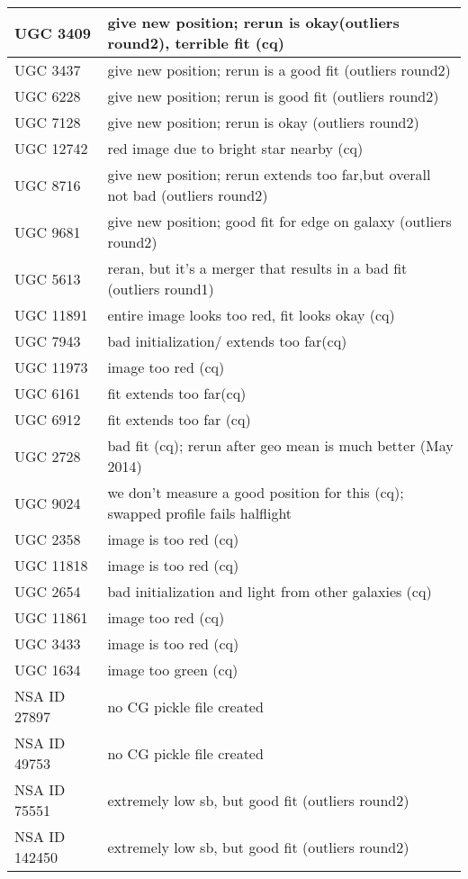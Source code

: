 \documentclass[10pt]{article}
\begin{document}
\begin{landscape}
\begin{longtable}{|l|l|}
UGC 3409 & give new position; rerun is okay(outliers round2), terrible fit (cq)\\ \hline 
UGC 3437 & give new position; rerun is a good fit (outliers round2)\\ \hline 
UGC 6228 & give new position; rerun is good fit (outliers round2)\\ \hline 
UGC 7128 & give new position; rerun is okay (outliers round2)\\ \hline 
UGC 12742 & red image due to bright star nearby (cq)\\ \hline
UGC 8716 & give new position; rerun extends too far,but overall not bad (outliers round2)\\ \hline
UGC 9681 & give new position; good fit for edge on galaxy (outliers round2)\\ \hline
UGC 5613 & reran, but it's a merger that results in a bad fit (outliers round1)\\ \hline
UGC 11891 & entire image looks too red, fit looks okay (cq)\\ \hline
UGC 7943 & bad initialization/ extends too far(cq)\\ \hline
UGC 11973 & image too red (cq)\\ \hline
UGC 6161 & fit extends too far(cq)\\ \hline
UGC 6912 & fit extends too far (cq)\\ \hline
UGC 2728 & bad fit (cq); rerun after geo mean is much better (May 2014)\\ \hline
UGC 9024 & we don't measure a good position for this (cq); swapped profile fails halflight\\ \hline
UGC 2358 & image is too red (cq)\\ \hline
UGC 11818 & image is too red (cq)\\ \hline
UGC 2654 & bad initialization and light from other galaxies (cq)\\ \hline
UGC 11861 & image too red (cq)\\ \hline
UGC 3433 & image is too red (cq)\\ \hline
UGC 1634 & image too green (cq)\\ \hline
NSA ID 27897 & no CG pickle file created\\ \hline
NSA ID 49753 & no CG pickle file created\\ \hline
NSA ID 75551 & extremely low sb, but good fit (outliers round2)\\ \hline
NSA ID 142450 & extremely low sb, but good fit (outliers round2)\\ \hline

\end{longtable}
\end{landscape}
\end{document}
